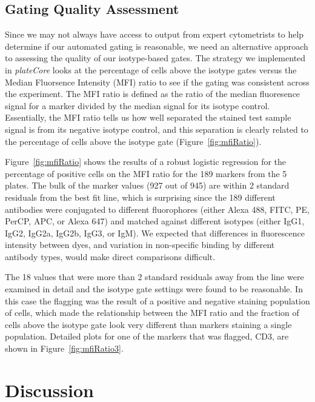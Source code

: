\documentclass[12pt]{article}
\newcommand{\Rpackage}[1]{{\textit{#1}}}
\begin{document}
\subsection*{Gating Quality Assessment}

Since we may not always have access to output from expert cytometrists to
help determine if our automated gating is reasonable, we need an alternative
approach to assessing the quality of our isotype-based gates. The strategy we
implemented in \Rpackage{plateCore} looks at the percentage of cells above the
isotype gates versus the Median Fluorsence Intensity (MFI) ratio to see if the
gating was consistent across the experiment. The
MFI ratio is defined as the ratio of the median fluoresence signal for a marker
divided by the median signal for its isotype control. Essentially, the MFI
ratio tells us how well separated the stained test sample signal is from its
negative isotype control, and this separation is clearly related to the
percentage of cells above the isotype gate (Figure~\ref{fig:mfiRatio}).

Figure~\ref{fig:mfiRatio} shows the results of a robust logistic regression for
the percentage of positive cells on the MFI ratio for the 189 markers
from the 5 plates. The bulk of the marker values (927 out of 945) are within 2
standard residuals from the best fit line, which is surprising since the 189
different antibodies were conjugated to different fluorophores (either Alexa
488, FITC, PE, PerCP, APC, or Alexa 647) and matched against different isotypes
(either IgG1, IgG2, IgG2a, IgG2b, IgG3, or IgM). We expected that differences
in fluorescence intensity between dyes, and variation in non-specific binding
by different antibody types, would make direct comparisons difficult. 

The 18 values that were more than 2 standard residuals away from the line were
examined in detail and the isotype gate settings were found to be reasonable. In
this case the flagging was the result of a positive and negative staining
population of cells, which made the relationship between the MFI ratio and the
fraction of cells above the isotype gate look very different than markers
staining a single population. Detailed plots for one of the markers that was
flagged, CD3, are shown in Figure~\ref{fig:mfiRatio3}. 


\clearpage
\section*{Discussion}
\end{document}

